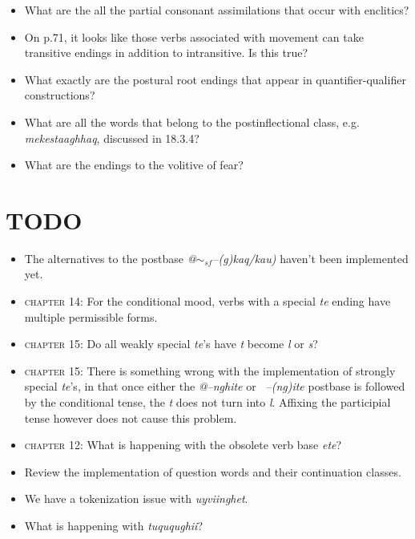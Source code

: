 \documentclass{article}
\begin{document}
\begin{itemize}
\item What are the all the partial consonant assimilations that occur with enclitics?

\item On p.71, it looks like those verbs associated with movement can take transitive endings in addition to intransitive.
%
Is this true?

\item What exactly are the postural root endings that appear in quantifier-qualifier constructions?

\item What are all the words that belong to the postinflectional class, e.g. \textit{mekestaaghhaq}, discussed in 18.3.4?

\item What are the endings to the volitive of fear?

\end{itemize}


\section{TODO}

\begin{itemize}
\renewcommand\labelitemi{$\cdot$}

\item The alternatives to the postbase \textit{@$\sim_{sf}$--(g)kaq/kau)} haven't been implemented yet.

\item \textsc{chapter 14}: For the conditional mood, verbs with a special \textit{te} ending have multiple permissible forms.

\item \textsc{chapter 15}: Do all weakly special \textit{te}'s have \textit{t} become \textit{l} or \textit{s}?

\item \textsc{chapter 15}: There is something wrong with the implementation of strongly special \textit{te}'s, in that once either the \textit{@--nghite} or \textit{~--(ng)ite} postbase is followed by the conditional tense, the \textit{t} does not turn into \textit{l}.
%
Affixing the participial tense however does not cause this problem.

\item \textsc{chapter 12}: What is happening with the obsolete verb base \textit{ete}?

\item Review the implementation of question words and their continuation classes.

\item We have a tokenization issue with \textit{uyviinghet}.

\item What is happening with \textit{tuququghii}?

\end{itemize}
\end{document}
